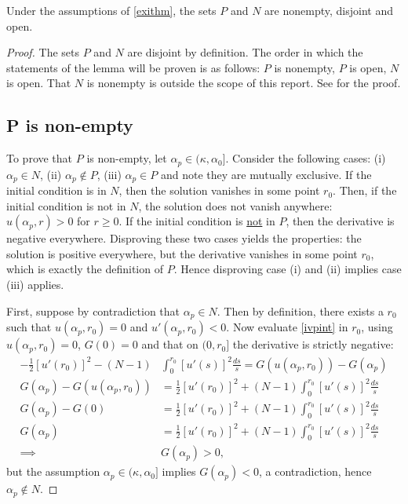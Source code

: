 \begin{lemma}\label{lem} Under the assumptions of \cref{exithm}, the sets $P$ and $N$ are nonempty, disjoint and open.
\end{lemma}
\begin{proof}
The sets $P$ and $N$ are disjoint by definition. The order in which the statements of the lemma will be proven is as follows: $P$ is nonempty, $P$ is open, $N$ is open. That $N$ is nonempty is outside the scope of this report. See \cite{ber} for the proof.

\subsection*{P is non-empty} 
To prove that $P$ is non-empty, let $\alpha_p\in(\kappa,\alpha_0]$. 
Consider the following cases: (i) $\alpha_p\in N$, (ii) $\alpha_p\notin P$, (iii) $\alpha_p\in P$ and note they are mutually exclusive. If the initial condition is in $N$, then the solution vanishes in some point $r_0$. Then, if the initial condition is not in $N$, the solution does not vanish anywhere: $u(\alpha_p,r)>0$ for $r\geq0$. If the initial condition is \underline{not} in $P$, then the derivative is negative everywhere. Disproving these two cases yields the properties: the solution is positive everywhere, but the derivative vanishes in some point $r_0$, which is exactly the definition of $P$. %
Hence disproving case (i) and (ii) implies case (iii) applies.

First, suppose by contradiction that $\alpha_p\in N$. Then by definition, there exists a $r_0$ such that $u(\alpha_p,r_0)=0$ and $u'(\alpha_p,r_0)<0$. Now evaluate \eqref{ivpint} in $r_0$, using $u(\alpha_p,r_0)=0$, $G(0)=0$ and that on $(0,r_0]$ the derivative is strictly negative:
\begin{align*}-\frac{1}{2}[u'(r_0)]^2-(N-1)&\int_0^{r_0}[u'(s)]^2\frac{ds}{s}=G(u(\alpha_p,r_0))-G(\alpha_p)\\
G(\alpha_p)-G(u(\alpha_p,r_0))&=\frac{1}{2}[u'(r_0)]^2+(N-1)\int_0^{r_0}[u'(s)]^2\frac{ds}{s}\\
G(\alpha_p)-G(0)&=\frac{1}{2}[u'(r_0)]^2+(N-1)\int_0^{r_0}[u'(s)]^2\frac{ds}{s}\\
G(\alpha_p)&=\frac{1}{2}[u'(r_0)]^2+(N-1)\int_0^{r_0}[u'(s)]^2\frac{ds}{s}\\
    \implies &G(\alpha_p)>0,
\end{align*}
but the assumption $\alpha_p\in(\kappa,\alpha_0]$ implies $G(\alpha_p)<0$, a contradiction, hence $\alpha_p\notin N$.


\end{proof}
